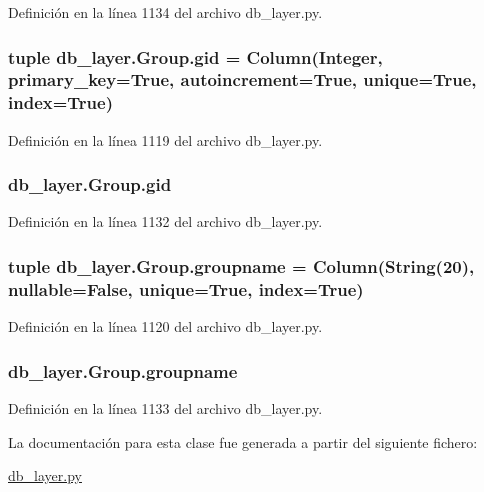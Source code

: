 Definición en la línea 1134 del archivo db\-\_\-layer.\-py.

\hypertarget{classdb__layer_1_1_group_ad04297ad13e077524983def6a0af935b}{
\subsubsection[{gid}]{\setlength{\rightskip}{0pt plus 5cm}tuple db\-\_\-layer.\-Group.\-gid = Column(Integer, primary\-\_\-key=True, autoincrement=True, unique=True, index=True)\hspace{0.3cm}{\ttfamily [static]}}}\label{classdb__layer_1_1_group_ad04297ad13e077524983def6a0af935b}


Definición en la línea 1119 del archivo db\-\_\-layer.\-py.

\hypertarget{classdb__layer_1_1_group_a552e384a20b221ca4638a4b4657e5dcd}{
\subsubsection[{gid}]{\setlength{\rightskip}{0pt plus 5cm}db\-\_\-layer.\-Group.\-gid}}\label{classdb__layer_1_1_group_a552e384a20b221ca4638a4b4657e5dcd}


Definición en la línea 1132 del archivo db\-\_\-layer.\-py.

\hypertarget{classdb__layer_1_1_group_adc9753e87b2f964d8f97215cd689ad16}{
\subsubsection[{groupname}]{\setlength{\rightskip}{0pt plus 5cm}tuple db\-\_\-layer.\-Group.\-groupname = Column(String(20), nullable=False, unique=True, index=True)\hspace{0.3cm}{\ttfamily [static]}}}\label{classdb__layer_1_1_group_adc9753e87b2f964d8f97215cd689ad16}


Definición en la línea 1120 del archivo db\-\_\-layer.\-py.

\hypertarget{classdb__layer_1_1_group_a564387ddb516e801f8f0ab0ec0537d5c}{
\subsubsection[{groupname}]{\setlength{\rightskip}{0pt plus 5cm}db\-\_\-layer.\-Group.\-groupname}}\label{classdb__layer_1_1_group_a564387ddb516e801f8f0ab0ec0537d5c}


Definición en la línea 1133 del archivo db\-\_\-layer.\-py.



La documentación para esta clase fue generada a partir del siguiente fichero\-:\begin{DoxyCompactItemize}
\item 
\hyperlink{db__layer_8py}{db\-\_\-layer.\-py}\end{DoxyCompactItemize}
